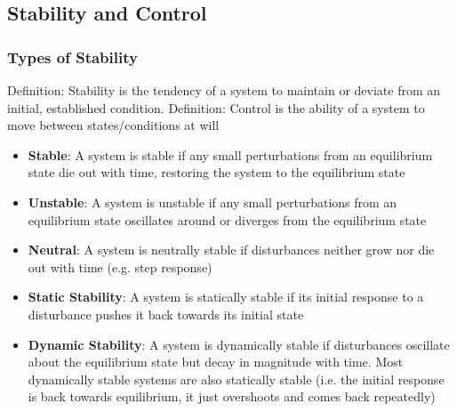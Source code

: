 \documentclass[11pt]{article}
\newcommand{\Item}[1]{\item \textbf{#1}:}
\begin{document}
\subsection{Stability and Control}
\subsubsection{Types of Stability}
Definition: Stability is the tendency of a system to maintain or deviate from an initial, established condition.
Definition: Control is the ability of a system to move between states/conditions at will
\begin{itemize}
\Item{Stable} A system is stable if any small perturbations from an equilibrium state die out with time, restoring the system to the equilibrium state
\Item{Unstable} A system is unstable if any small perturbations from an equilibrium state oscillates around or diverges from the equilibrium state
\Item{Neutral} A system is neutrally stable if disturbances neither grow nor die out with time (e.g. step response)
\Item{Static Stability} A system is statically stable if its initial response to a disturbance pushes it back towards its initial state
\Item{Dynamic Stability} A system is dynamically stable if disturbances oscillate about the equilibrium state but decay in magnitude with time. Most dynamically stable systems are also statically stable (i.e. the initial response is back towards equilibrium, it just overshoots and comes back repeatedly)
\end{itemize}
\end{document}
